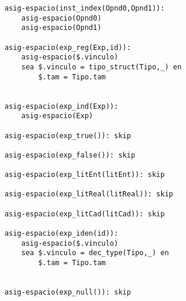 \begin{lstlisting}
    asig-espacio(inst_index(Opnd0,Opnd1)):
        asig-espacio(Opnd0)
        asig-espacio(Opnd1)

    asig-espacio(exp_reg(Exp,id)):
        asig-espacio($.vinculo)
        sea $.vinculo = tipo_struct(Tipo,_) en
            $.tam = Tipo.tam
       

    asig-espacio(exp_ind(Exp)):
        asig-espacio(Exp)

    asig-espacio(exp_true()): skip

    asig-espacio(exp_false()): skip

    asig-espacio(exp_litEnt(litEnt)): skip

    asig-espacio(exp_litReal(litReal)): skip

    asig-espacio(exp_litCad(litCad)): skip

    asig-espacio(exp_iden(id)):
        asig-espacio($.vinculo)
        sea $.vinculo = dec_type(Tipo,_) en
            $.tam = Tipo.tam
            

    asig-espacio(exp_null()): skip


\end{lstlisting}